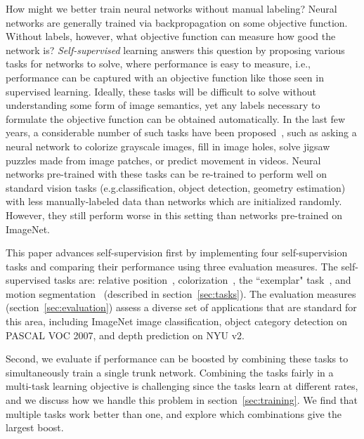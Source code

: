 \documentclass[10pt,twocolumn,letterpaper]{article}
\begin{document}
How might we better train neural networks without manual labeling?
Neural networks are generally trained via backpropagation on some objective function.
Without labels, however, what objective function can measure how good the network is?
\textit{Self-supervised} learning answers this question by proposing various tasks for networks to solve, where performance is easy to measure, i.e., performance can be captured with an objective function like those seen in supervised learning.
Ideally, these tasks will be difficult to solve without understanding some form of image semantics, yet any labels necessary to formulate the objective function can be obtained automatically.
In the last few years, a considerable number of such tasks have been proposed~\cite{agrawal2015learning,agrawal2016learning,denton2016semi,doersch2015unsupervised,dosovitskiy2014discriminative,jayaraman2015learning,larsson2016learning,li2016unsupervised,misra2016shuffle,noroozi2016unsupervised,owens2016ambient,pathak2016learning,pathak2016context,pinto2016supervision,pinto2016supersizing,walker2016uncertain,walker2015dense,wang2015unsupervised,wiskott2002slow,zhang2016colorful,zou2012deep}, such as asking a neural network to colorize grayscale images, fill in image holes, solve jigsaw puzzles made from image patches, or predict movement in videos.
Neural networks pre-trained with these tasks can be re-trained to perform well on standard vision tasks (e.g.\image classification, object detection, geometry estimation) with less manually-labeled data than networks which are initialized randomly.  
However, they still perform worse in this setting than networks pre-trained on ImageNet.

This paper advances self-supervision first by implementing four self-supervision tasks and comparing their performance using three evaluation measures. 
The self-supervised tasks are: relative position~\cite{doersch2015unsupervised}, colorization~\cite{zhang2016colorful}, the ``exemplar" task~\cite{dosovitskiy2014discriminative}, and motion segmentation~\cite{pathak2016learning} (described in section~\ref{sec:tasks}). 
The evaluation measures (section~\ref{sec:evaluation}) assess a diverse set of applications that are standard for this area, including ImageNet image classification, object category detection on PASCAL VOC 2007, and depth prediction on NYU v2.

Second, we evaluate if performance can be boosted by combining these
tasks to simultaneously train a single trunk network.  Combining the
tasks fairly in a multi-task learning objective is challenging since
the tasks learn at different rates, and we discuss how we handle this
problem in section~\ref{sec:training}.
We find that multiple tasks work better than one, and explore which
combinations give the largest boost.
\end{document}
